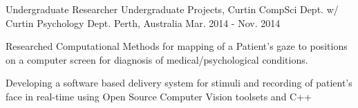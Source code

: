 \begin{cventries}

\cventry
    {Undergraduate Researcher} %
    {Undergraduate Projects, Curtin CompSci Dept. w/ Curtin Psychology Dept.} %
    {Perth, Australia} %
    {Mar. 2014 - Nov. 2014} %
    {
      \begin{cvitems} %
        \item {Researched Computational Methods for mapping of a Patient’s gaze to positions on a computer screen for diagnosis of medical/psychological conditions.}
        \item {Developing a software based delivery system for stimuli and recording of patient’s face in real-time using Open Source Computer Vision toolsets and C++}
      \end{cvitems}
    }

\end{cventries}
